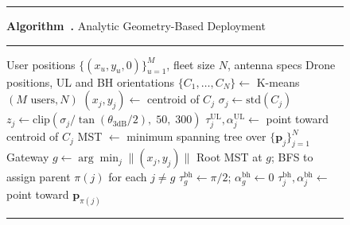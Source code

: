 \documentclass[conference]{IEEEtran}
\newcommand{\vect}[1]{\bm{#1}}
\newcommand{\posv}[1]{\vect{p}_{#1}}
\newcounter{algorithm}
\renewcommand{\thealgorithm}{\arabic{algorithm}}
\begin{document}
\begin{figure}[t]
\label{alg:analytic}
\centering
\begin{minipage}{\columnwidth}
\hrule
\vspace{2pt}
\textbf{Algorithm~\thealgorithm.} Analytic Geometry-Based Deployment
\vspace{2pt}
\hrule

\begin{algorithmic}[1]
\REQUIRE User positions $\{(x_u, y_u, 0)\}_{u=1}^{M}$, fleet size $N$, antenna specs
\ENSURE Drone positions, UL and BH orientations
\STATE $\{C_1, \ldots, C_N\} \leftarrow$ K-means$(M \text{ users}, N)$
    \STATE $(x_j, y_j) \leftarrow$ centroid of $C_j$
    \STATE $\sigma_j \leftarrow \mathrm{std}(C_j)$
    \STATE $z_j \leftarrow \mathrm{clip}\!\left(\sigma_j / \tan(\theta_{3\mathrm{dB}}/2),\; 50,\; 300\right)$
    \STATE $\tau_j^{\mathrm{UL}}, \alpha_j^{\mathrm{UL}} \leftarrow$ point toward centroid of $C_j$ 
\ENDFOR
\STATE MST $\leftarrow$ minimum spanning tree over $\{\posv{j}\}_{j=1}^{N}$
\STATE Gateway $g \leftarrow \arg\min_j \|(x_j, y_j)\|$ 
\STATE Root MST at $g$; BFS to assign parent $\pi(j)$ for each $j \neq g$
\STATE $\tau_g^{\mathrm{bh}} \leftarrow \pi/2$;\; $\alpha_g^{\mathrm{bh}} \leftarrow 0$ 
    \STATE $\tau_j^{\mathrm{bh}}, \alpha_j^{\mathrm{bh}} \leftarrow$ point toward $\posv{\pi(j)}$
\ENDFOR
\end{algorithmic}
\vspace{2pt}
\hrule
\end{minipage}
\end{figure}


\end{document}

